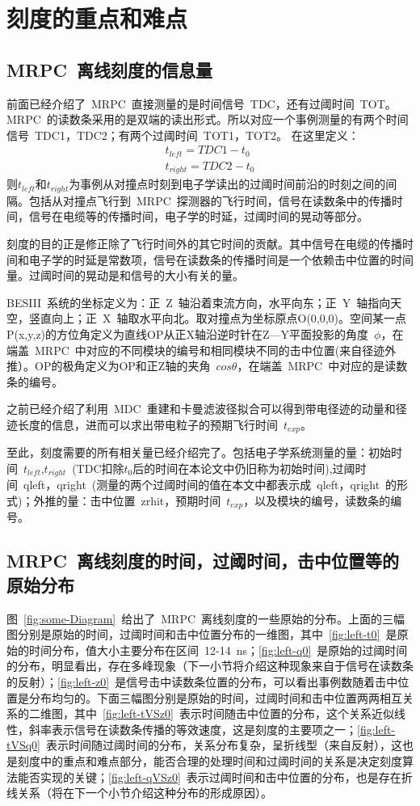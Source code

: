 \section{刻度的重点和难点}
\subsection{MRPC~离线刻度的信息量}
前面已经介绍了~MRPC~直接测量的是时间信号~TDC，还有过阈时间~TOT。MRPC~的读数条采用的是双端的读出形式。所以对应一个事例测量的有两个时间信号~TDC1，TDC2；有两个过阈时间~TOT1，TOT2。
在这里定义：
\begin{align}
t_{left}=TDC1-t_{0}
\label{eq:tleft}\\
t_{right}=TDC2-t_{0}
\label{eq:2}
\end{align}
则$t_{left}$和$t_{right}$为事例从对撞点时刻到电子学读出的过阈时间前沿的时刻之间的间隔。包括从对撞点飞行到~MRPC~探测器的飞行时间，信号在读数条中的传播时间，信号在电缆等的传播时间，电子学的时延，过阈时间的晃动等部分。

刻度的目的正是修正除了飞行时间外的其它时间的贡献。其中信号在电缆的传播时间和电子学的时延是常数项，信号在读数条的传播时间是一个依赖击中位置的时间量。过阈时间的晃动是和信号的大小有关的量。

BESIII~系统的坐标定义为：正~Z~轴沿着束流方向，水平向东；正~Y~轴指向天空，竖直向上；正~X~轴取水平向北。取对撞点为坐标原点O(0,0,0)。空间某一点P(x,y,z)的方位角定义为直线OP从正X轴沿逆时针在Z—Y平面投影的角度~$\phi$，在端盖~MRPC~中对应的不同模块的编号和相同模块不同的击中位置(来自径迹外推）。OP的极角定义为OP和正Z轴的夹角~$cos\theta$，在端盖~MRPC~中对应的是读数条的编号。

之前已经介绍了利用~MDC~重建和卡曼滤波径拟合可以得到带电径迹的动量和径迹长度的信息，进而可以求出带电粒子的预期飞行时间~$t_{exp}$。

至此，刻度需要的所有相关量已经介绍完了。包括电子学系统测量的量：初始时间~$t_{left}$,$t_{right}$~(TDC扣除$t_{0}$后的时间在本论文中仍旧称为初始时间),过阈时间~qleft，qright~(测量的两个过阈时间的值在本文中都表示成~qleft，qright~的形式)；外推的量：击中位置~zrhit，预期时间~$t_{exp}$，以及模块的编号，读数条的编号。
\subsection{MRPC~离线刻度的时间，过阈时间，击中位置等的原始分布}
图~\ref{fig:some-Diagram}~给出了~MRPC~离线刻度的一些原始的分布。上面的三幅图分别是原始的时间，过阈时间和击中位置分布的一维图，其中~\ref{fig:left-t0}~是原始的时间分布，值大小主要分布在区间~12-14~ns；\ref{fig:left-q0}~是原始的过阈时间的分布，明显看出，存在多峰现象（下一小节将介绍这种现象来自于信号在读数条的反射）；\ref{fig:left-z0}~是信号击中读数条位置的分布，可以看出事例数随着击中位置是分布均匀的。下面三幅图分别是原始的时间，过阈时间和击中位置两两相互关系的二维图，其中~\ref{fig:left-tVSz0}~表示时间随击中位置的分布，这个关系近似线性，斜率表示信号在读数条传播的等效速度，这是刻度的主要项之一；\ref{fig:left-tVSq0}~表示时间随过阈时间的分布，关系分布复杂，呈折线型（来自反射），这也是刻度中的重点和难点部分，能否合理的处理时间和过阈时间的关系是决定刻度算法能否实现的关键；\ref{fig:left-qVSz0}~表示过阈时间和击中位置的分布，也是存在折线关系（将在下一个小节介绍这种分布的形成原因）。

